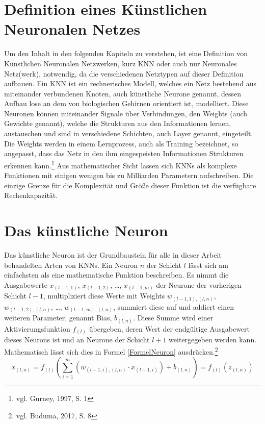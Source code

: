 \documentclass[a4paper,12pt,ngerman,oneside]{scrreprt}	%
\begin{document}
		\section{Definition eines Künstlichen Neuronalen Netzes}\label{DefKNN}
		Um den Inhalt in den folgenden Kapiteln zu verstehen, ist eine Definition von Künstlichen Neuronalen Netzwerken, kurz KNN oder auch nur Neuronales Netz(werk), notwendig, da die verschiedenen Netztypen auf dieser Definition aufbauen. Ein KNN ist ein rechnerisches Modell, welches ein Netz bestehend aus miteinander verbundenen Knoten, auch künstliche Neurone genannt, dessen Aufbau lose an dem von biologischen Gehirnen orientiert ist, modelliert. Diese Neuronen können miteinander Signale über Verbindungen, den Weights (auch Gewichte genannt), welche die Strukturen aus den Informationen lernen, austauschen und sind in verschiedene Schichten, auch Layer genannt, eingeteilt. Die Weights werden in einem Lernprozess, auch als Training bezeichnet, so angepasst, dass das Netz in den ihm eingespeisten Informationen Strukturen erkennen kann.\footnote{vgl. Gurney, 1997, S. 1} Aus mathematischer Sicht lassen sich KNNs als komplexe Funktionen mit einigen wenigen bis zu Milliarden Parametern aufschreiben. Die einzige Grenze für die Komplexität und Größe dieser Funktion ist die verfügbare Rechenkapazität. 
		\section{Das künstliche Neuron}\label{DefKN}
		Das künstliche Neuron ist der Grundbaustein für alle in dieser Arbeit behandelten Arten von KNNs. Ein Neuron $n$ der Schicht $l$ lässt sich am einfachsten als eine mathematische Funktion beschreiben. Es nimmt die Ausgabewerte $x_{(l-1,1)}$, $x_{(l-1,2)}$, …, $x_{(l-1,m)}$ der Neurone der vorherigen Schicht $l-1$, multipliziert diese Werte mit Weights $w_{(l-1,1),(l,n)}$, $w_{(l-1,2),(l,n)}$, …, $w_{(l-1,m),(l,n)}$, summiert diese auf und addiert einen weiteren Parameter, genannt Bias, $b_{(l,n)}$. Diese Summe wird einer Aktivierungsfunktion $f_{(l)}$ übergeben, deren Wert der endgültige Ausgabewert dieses Neurons ist und an Neurone der Schicht $l+1$ weitergegeben werden kann. Mathematisch lässt sich dies in Formel \ref{FormelNeuron} ausdrücken.\footnote{vgl. Buduma, 2017, S. 8}
			\begin{equation}\label{FormelNeuron}
				x_{(l,n)} = f_{(l)} \left(\sum_{i=1}^{m}(w_{(l-1,i),(l,n)} \cdot x_{(l-1,i)}) + b_{(l,n)} \right) = f_{(l)}(z_{(l,n)})
			\end{equation}
\end{document}
